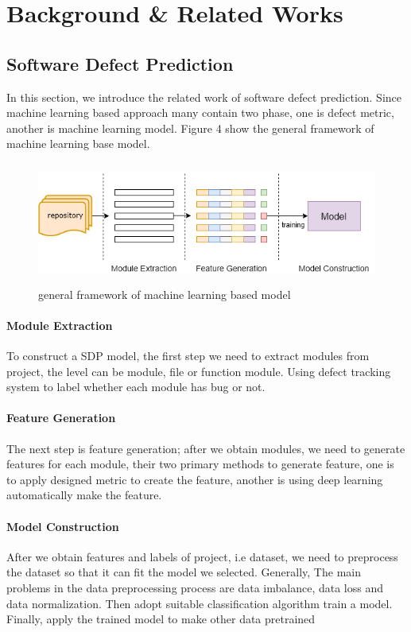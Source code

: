 \chapter{Background \& Related Works}
\section{Software Defect Prediction}
In this section, we introduce the related work of software defect prediction. Since machine learning based approach many contain two phase, one is defect metric, another is machine learning model. Figure 4 show the general framework of machine learning base model. 
\begin{figure}
    \centering
    \includegraphics[width=12cm,height=4cm]{pic/defect_overview.png}
    \caption{general framework of machine learning based model}
    \label{fig:my_label}
\end{figure}
\subsubsection{Module Extraction}
To construct a SDP model, the first step we need to extract modules from project, the level can be module, file or function module. Using defect tracking system to label whether each module has bug or not.
\subsubsection{Feature Generation}
The next step is feature generation; after we obtain modules, we need to generate features for each module, their two primary methods to generate feature, one is to apply designed metric to create the feature, another is using deep learning automatically make the feature.
\subsubsection{Model Construction}
After we obtain features and labels of project, i.e dataset, we need to preprocess the dataset so that it can fit the model we selected. Generally, The main problems in the data preprocessing process are data imbalance, data loss and data normalization. Then adopt suitable classification algorithm train a model. Finally, apply the trained model to make other data pretrained 
